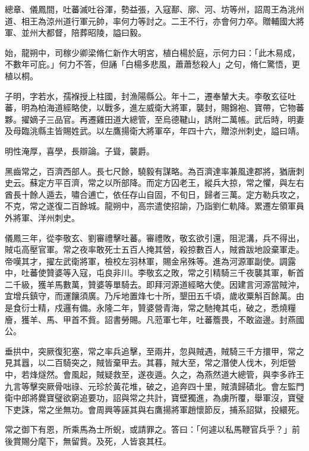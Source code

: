 \begin{pinyinscope}
 總章、儀鳳間，吐蕃滅吐谷渾，勢益張，入寇鄯、廓、河、坊等州，詔周王為洮州道、相王為涼州道行軍元帥，率何力等討之。二王不行，亦會何力卒。贈輔國大將軍、並州大都督，陪葬昭陵，謚曰毅。



 始，龍朔中，司稼少卿梁脩仁新作大明宮，植白楊於庭，示何力曰：「此木易成，不數年可庇。」何力不答，但誦「白楊多悲風，蕭蕭愁殺人」之句，脩仁驚悟，更植以桐。



 子明，字若水，孺褓授上柱國，封漁陽縣公。年十二，遷奉輦大夫。李敬玄征吐蕃，明為柏海道經略使，以戰多，進左威衛大將軍，襲封，賜錦袍、寶帶，它物蕃夥。擢嫡子三品官。再遷雞田道大總管，至烏德鞬山，誘附二萬帳。武后時，明妻及母臨洮縣主皆賜姓武。以左鷹揚衛大將軍卒，年四十六，贈涼州刺史，謚曰靖。



 明性淹厚，喜學，長辯論。子聳，襲爵。



 黑齒常之，百濟西部人。長七尺餘，驍毅有謀略。為百濟達率兼風達郡將，猶唐刺史云。蘇定方平百濟，常之以所部降。而定方囚老王，縱兵大掠，常之懼，與左右酋長十餘人遁去，嘯合逋亡，依任存山自固，不旬日，歸者三萬。定方勒兵攻之，不克，常之遂復二百餘城。龍朔中，高宗遣使招諭，乃詣劉仁軌降。累遷左領軍員外將軍、洋州刺史。



 儀鳳三年，從李敬玄、劉審禮擊吐蕃。審禮敗，敬玄欲引還，阻泥溝，兵不得出，賊屯高壓官軍。常之夜率敢死士五百人掩其營，殺掠數百人，賊酋跋地設棄軍走。帝嘆其才，擢左武衛將軍，檢校左羽林軍，賜金帛殊等。進為河源軍副使。調露中，吐蕃使贊婆等入寇，屯良非川。李敬玄之敗，常之引精騎三千夜襲其軍，斬首二千級，獲羊馬數萬，贊婆等單騎去。即拜河源道經略大使。因建言河源當賊沖，宜增兵鎮守，而運饟須廣。乃斥地置烽七十所，墾田五千頃，歲收粟斛百餘萬。由是食衍士精，戍邏有備。永隆二年，贊婆營青海，常之馳掩其屯，破之，悉燒糧廥，獲羊、馬、甲首不貲。詔書勞賜。凡蒞軍七年，吐蕃簷畏，不敢盜邊。封燕國公。



 垂拱中，突厥復犯塞，常之率兵追擊，至兩井，忽與賊遇，賊騎三千方擐甲，常之見其囂，以二百騎突之，賊皆棄甲去。其暮，賊大至，常之潛使人伐木，列炬營中，若烽燧然。會風起，賊疑救至，遂夜遁。久之，為燕然道大總管，與李多祚王九言等擊突厥骨咄祿、元珍於黃花堆，破之，追奔四十里，賊潰歸磧北。會左監門衛中郎將爨寶璧欲窮追要功，詔與常之共計，寶壁獨進，為虜所覆，舉軍沒，寶璧下吏誅，常之坐無功。會周興等誣其與右鷹揚將軍趙懷節反，捕系詔獄，投繯死。



 常之御下有恩，所乘馬為士所蜺，或請罪之。答曰：「何遽以私馬鞭官兵乎？」前後賞賜分麾下，無留貲。及死，人皆哀其枉。




\end{pinyinscope}
